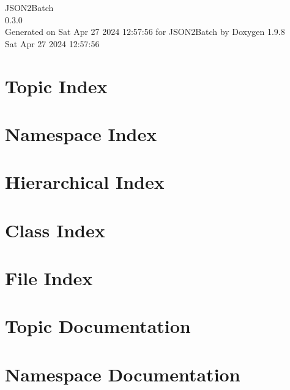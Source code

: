 \documentclass[twoside]{book}
\newcommand{\+}{\discretionary{\mbox{\scriptsize$\hookleftarrow$}}{}{}}
\newcommand{\clearemptydoublepage}{%
    \newpage{\pagestyle{empty}\cleardoublepage}%
  }
\begin{document}
  \raggedbottom
    \hypersetup{pageanchor=false,
                bookmarksnumbered=true,
                pdfencoding=unicode
               }
  \begin{titlepage}
  \vspace*{7cm}
  \begin{center}%
  {\Large JSON2\+Batch}\\
  [1ex]\large 0.\+3.\+0 \\
  \vspace*{1cm}
  {\large Generated on Sat Apr 27 2024 12\+:57\+:56 for JSON2\+Batch by Doxygen 1.9.8}\\
    \vspace*{0.5cm}
    {\small Sat Apr 27 2024 12:57:56}
  \end{center}
  \end{titlepage}
  \clearemptydoublepage
  \tableofcontents
  \clearemptydoublepage
  \hypersetup{pageanchor=true}

\chapter{Topic Index}

\chapter{Namespace Index}

\chapter{Hierarchical Index}

\chapter{Class Index}

\chapter{File Index}

\chapter{Topic Documentation}

\chapter{Namespace Documentation}





\end{document}
